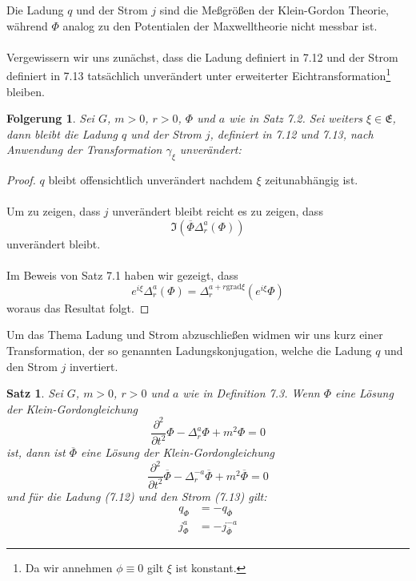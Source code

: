 \documentclass[11pt,a4paper,leqno]{report}
\newtheorem{proposition}{Satz}[chapter]
\newtheorem{corollary}[theorem]{Folgerung}
\numberwithin{equation}{chapter}
\begin{document}
\noindent
Die Ladung $q$ und der Strom $j$ sind die Me\ss{}gr\"o\ss{}en der Klein-Gordon Theorie, w\"ahrend $\Phi$ analog zu den Potentialen der Maxwelltheorie nicht messbar ist.\\
\\
Vergewissern wir uns zun\"achst, dass die Ladung definiert in 7.12 und der Strom definiert in 7.13 tats\"achlich unver\"andert unter erweiterter Eichtransformation\footnote{Da wir annehmen $\phi\equiv 0$ gilt $\xi$ ist konstant.} bleiben.
\begin{corollary}
	Sei $G$, $m>0$, $r>0$, $\Phi$ und $a$ wie in Satz 7.2. Sei weiters $\xi\in \mathfrak{E}$, dann bleibt die Ladung $q$ und der Strom $j$, definiert in 7.12 und 7.13, nach Anwendung der Transformation $\gamma_\xi$ unver\"andert:
\end{corollary}
\begin{proof}
	$q$ bleibt offensichtlich unver\"andert nachdem $\xi$ zeitunabh\"angig ist.\\
	\\
	Um zu zeigen, dass $j$ unver\"andert bleibt reicht es zu zeigen, dass $$\Im(\overline{\Phi}\Delta^a_r(\Phi))$$ unver\"andert bleibt.\\
	\\
	Im Beweis von Satz 7.1 haben wir gezeigt, dass 
	\begin{equation*}
		e^{i\xi}\Delta_r^a(\Phi) = \Delta_r^{a + r\text{grad}\xi}(e^{i\xi}\Phi)
	\end{equation*}
	woraus das Resultat folgt.
\end{proof}
\noindent
Um das Thema Ladung und Strom abzuschlie\ss{}en widmen wir uns kurz einer Transformation, der so genannten Ladungskonjugation, welche die Ladung $q$ und den Strom $j$ invertiert. 
\begin{proposition}
	Sei $G$, $m>0$, $r>0$ und $a$ wie in Definition 7.3. Wenn $\Phi$ eine L\"osung der Klein-Gordongleichung
	\begin{equation}
		\frac{\partial^2}{\partial t^2}\Phi - \Delta^{a}_r\Phi+ m^2 \Phi = 0
	\end{equation}
	ist, dann ist $\overline{\Phi}$ eine L\"osung der Klein-Gordongleichung
	\begin{equation}
		\frac{\partial^2}{\partial t^2}\overline{\Phi} - \Delta^{-a}_r\overline{\Phi}+ m^2 \overline{\Phi} = 0
	\end{equation}
	und f\"ur die Ladung (7.12) und den Strom (7.13) gilt:
	\begin{align}
		q_\Phi &= - q_{\overline{\Phi}}\\
		j_\Phi^a &= - j_{\overline{\Phi}}^{-a}
	\end{align}
\end{proposition}
\end{document}
